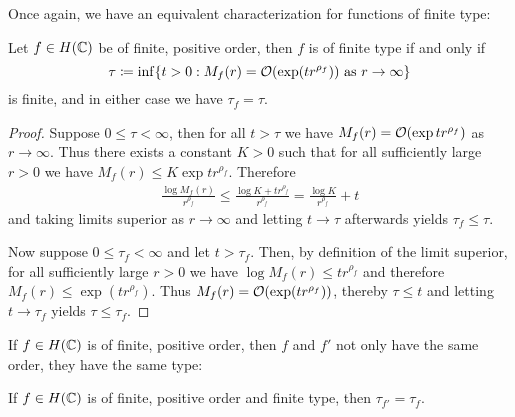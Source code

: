 Once again, we have an equivalent characterization for functions of finite type:

\begin{proposition} \label{prop:type-infimum}
    Let $f \in H(\mathbb{C})$ be of finite, positive order, then $f$ is of finite type if and only if
    \begin{equation}
        \tau \coloneqq \inf \{ t > 0 : M_f(r) = \mathcal{O}(\exp (t r^{\rho_f})) \textrm{ as } r \to \infty \}
    \end{equation}
    is finite, and in either case we have $\tau_f = \tau$.
\end{proposition}

\begin{proof}
    Suppose $0 \leq \tau < \infty$, then for all $t > \tau$ we have $M_f(r) = \mathcal{O}(\exp t r^{\rho_f})$ as $r \to \infty$. Thus there exists a constant $K > 0$ such that for all sufficiently large $r > 0$ we have $M_f(r) \leq K \exp t r^{\rho_f}$. Therefore
    \begin{align*}
        \frac{\log M_f(r)}{r^{\rho_f}} \leq \frac{\log K + t r^{\rho_f}}{r^{\rho_f}} = \frac{\log K}{r^{\rho_f}} + t
    \end{align*}
    and taking limits superior as $r \to \infty$ and letting $t \to \tau$ afterwards yields $\tau_f \leq \tau$.

    Now suppose $0 \leq \tau_f < \infty$ and let $t > \tau_f$. Then, by definition of the limit superior, for all sufficiently large $r > 0$ we have $ \log M_f(r) \leq t r^{\rho_f}$ and therefore $M_f(r) \leq \exp(t r^{\rho_f})$. Thus $M_f(r) = \mathcal{O}(\exp (t r^{\rho_f}))$, thereby $\tau \leq t$ and letting $t \to \tau_f$ yields $\tau \leq \tau_f$.
\end{proof}


If $f \in H(\mathbb{C})$ is of finite, positive order, then $f$ and $f'$ not only have the same order, they have the same type:

\begin{proposition} \label{prop:type-derivative}
    If $f \in H(\mathbb{C})$ is of finite, positive order and finite type, then $\tau_{f'} = \tau_f$.
\end{proposition}

